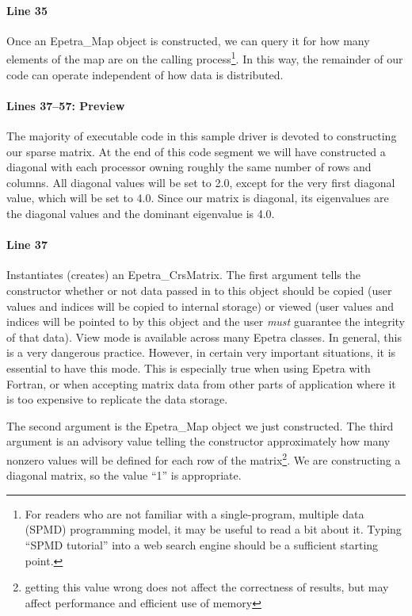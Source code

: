 \documentclass[12pt,relax]{EpetraUserGuide}
\newcommand{\map}{Epetra\_Map}
\newcommand{\crsmatrix}{Epetra\_CrsMatrix}
\begin{document}
\paragraph{Line 35}
Once an \map{} object is constructed, we can query it for how many
elements of the map are on the calling process\footnote{For readers
who are not familiar with a single-program, multiple data (SPMD)
programming model, it may be useful to read a bit about it.  Typing
``SPMD tutorial'' into a web search engine should be a sufficient
starting point.}.  In this way, the remainder of our code can operate
independent of how data is distributed.
\paragraph{Lines 37--57: Preview}
The majority of executable code in this sample driver is devoted to
constructing our sparse matrix.  At the end of this code segment we
will have constructed a diagonal with each processor owning roughly
the same number of rows and columns.  All diagonal values will be set
to 2.0, except for the very first diagonal value, which will be set to
4.0.  Since our matrix is diagonal, its eigenvalues are the diagonal
values and the dominant eigenvalue is 4.0.  
\paragraph{Line 37}
Instantiates (creates) an \crsmatrix{}.  The first argument tells the
constructor whether or not data passed in to this object should be
copied (user values and indices will be copied to internal storage) or
viewed (user values and indices will be pointed to by this object and
the user {\it must} guarantee the integrity of that data).  View mode
is available across many Epetra classes.  In general, this is a very
dangerous practice.  However, in certain very important situations, it
is essential to have this mode.  This is especially true when using
Epetra with Fortran, or when accepting matrix data from other parts of
application where it is too expensive to replicate the data storage.

The second argument is the \map{} object we just constructed.  The
third argument is an advisory value telling the constructor
approximately how many nonzero values will be defined for each row of
the matrix\footnote{getting this value wrong does not
affect the correctness of results, but may affect performance and
efficient use of memory}.  We are constructing a diagonal matrix, so the value ``1''
is appropriate.
\end{document}
